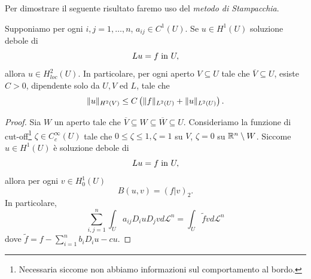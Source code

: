 Per dimostrare il seguente risultato faremo uso del \emph{metodo di Stampacchia}.
\begin{teorema}
	Supponiamo per ogni $i,j=1,\dots,n$, $a_{ij} \in C^1(U)$. Se $u \in H^1(U)$ soluzione debole di 
	\[ Lu= f \; \textup{in } U, \]
	allora $u \in H^2_{loc}(U)$. In particolare, per ogni aperto $V \subseteq U$ tale che $\overline{V} \subseteq U$, esiste $C>0$, dipendente solo da $U,V$ ed $L$, tale che 
	\[ \lVert u\rVert_{H^2(V)} \le C\left( \lVert f\rVert_{L^2(U)} + \lVert u\rVert_{L^2(U)}\right).   \]
\end{teorema}
\begin{proof}
	Sia $W$ un aperto tale che $\overline{V} \subseteq W \subseteq \overline{W} \subseteq U$. Consideriamo la funzione di cut-off\footnote{Necessaria siccome non abbiamo informazioni sul comportamento al bordo.} $\zeta \in C^\infty_c(U)$ tale che $0\le \zeta \le 1, \zeta = 1$ su $V$, $\zeta = 0$ su $\mathbb{R}^n \setminus W$.
	Siccome $u \in H^1(U)$ è soluzione debole di 
	\[ Lu= f \; \textup{in } U, \]
	allora per ogni $v \in H^1_0(U)$ 
	\[ B(u,v) = (f|v)_2. \]
	In particolare,
	\[ \sum_{i,j=1}^n \int_U a_{ij}D_i u D_j v d\mathcal{L}^n = \int_U \tilde{f}v d\mathcal{L}^n \]
	dove $\tilde{f} = f - \sum_{i=1}^nb_i D_i u - cu. $
	

\end{proof}

